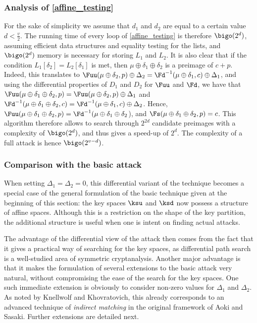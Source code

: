 \subsubsection{Analysis of \autoref{affine_testing}}
For the sake of simplicity we assume that $d_1$ and $d_2$ are equal to a certain value $d < \frac{v}{2}$.
The running time of every loop of \autoref{affine_testing} is therefore $\bigo(2^d)$, assuming efficient
data structures and equality testing for the lists,
and $\bigo(2^d)$ memory is necessary for storing $L_1$ and $L_2$. It is also
clear that if the condition $L_1[\delta_2] = L_2[\delta_1]$ is met, then $\mu \oplus \delta_1 \oplus \delta_2$
is a preimage of $c + p$. Indeed, this translates to $\Fuu(\mu \oplus \delta_2, p) \oplus \Delta_2
= \Fd^{-1}(\mu \oplus \delta_1, c) \oplus \Delta_1$, and using the differential properties
of $D_1$ and $D_2$ for $\Fuu$ and $\Fd$, we
have that $\Fuu(\mu \oplus \delta_1 \oplus \delta_2, p) = \Fuu(\mu \oplus \delta_2, p) \oplus \Delta_1$
and $\Fd^{-1}(\mu \oplus \delta_1 \oplus \delta_2, c) = \Fd^{-1}(\mu \oplus \delta_1, c) \oplus \Delta_2$.
Hence, $\Fuu(\mu \oplus \delta_1 \oplus \delta_2, p) = \Fd^{-1}(\mu \oplus \delta_1 \oplus \delta_2$), and
$\Fs(\mu \oplus \delta_1 \oplus \delta_2, p) = c$.
This algorithm therefore allows to search through $2^{2d}$ candidate preimages with a complexity
of $\bigo(2^d)$, and thus gives a speed-up of $2^d$. The complexity of a full attack is hence $\bigo(2^{v - d})$.

\subsubsection{Comparison with the basic \mitm attack}
When setting $\Delta_1 = \Delta_2 = 0$, this differential variant of the \mitm technique becomes a special case
of the general formulation of the basic technique given at the beginning of this section: the key spaces $\ksu$ and $\ksd$ now possess a structure
of affine spaces.
Although this is a restriction on the shape of the key partition, the additional structure is useful when one is intent on finding actual attacks.

The advantage of the differential view of the \mitm attack then comes from the fact that it gives a practical way of searching for the key spaces,
as differential path search is a well-studied area of symmetric cryptanalysis. Another major advantage is that it makes the formulation of
several extensions to the basic attack very natural, without compromising the ease of the search for the key spaces. One such immediate
extension is obviously to consider non-zero values for $\Delta_1$ and $\Delta_2$. As noted by Knellwolf and Khovratovich,
this already corresponds to an advanced technique of \emph{indirect matching} in the original framework of Aoki and Sasaki.
Further extensions are detailed next.

